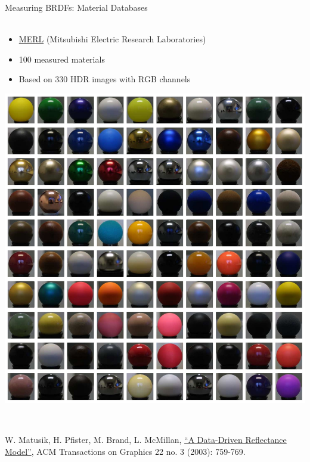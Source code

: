 \documentclass[utf8,stillsansserifmath,fleqn,t]{beamer}
\newcommand{\literature}[1]{{\tiny #1 \par}}
\begin{document}
\begin{frame}
\frametitle{\insertsection}
Measuring BRDFs: Material Databases\\~\\
\begin{minipage}{.49\textwidth}
\begin{itemize}
\item \href{https://cdfg.csail.mit.edu/wojciech/brdfdatabase}{MERL} (Mitsubishi Electric Research Laboratories)
\item 100 measured materials
\item Based on 330 HDR images with RGB channels
\end{itemize}
\end{minipage}\hfill
\begin{minipage}{.49\textwidth}
\centerline{\includegraphics[width=\textwidth]{./fig/merl.jpg}}
\end{minipage}\\[1ex]
\literature{W. Matusik, H. Pfister, M. Brand, L. McMillan, \href{}{``A
Data-Driven Reflectance Model''}, ACM Transactions on Graphics 22 no. 3 (2003):
759-769.}
\end{frame}
\end{document}
